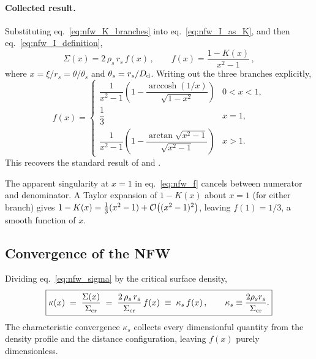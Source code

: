 \paragraph{Collected result.}
Substituting eq.~\eqref{eq:nfw_K_branches} into
eq.~\eqref{eq:nfw_I_as_K}, and then eq.~\eqref{eq:nfw_I_definition},
\begin{equation}
    \boxed{
    \Sigma(x) = 2\,\rho_s\,r_s\, f(x)\,,
    \qquad
    f(x) = \frac{1 - K(x)}{x^2 - 1}\,,}
    \label{eq:nfw_sigma}
\end{equation}
where $x = \xi / r_s = \theta / \theta_s$ and $\theta_s = r_s / D_{\mathrm{d}}$.
Writing out the three branches explicitly,
\begin{equation}
    f(x) = \begin{cases}
    \dfrac{1}{x^2 - 1}\!\left(1 - \dfrac{\operatorname{arccosh}(1/x)}{\sqrt{1-x^2}}\right)
            & 0 < x < 1, \\[8pt]
    \dfrac{1}{3} & x = 1, \\[8pt]
    \dfrac{1}{x^2 - 1}\!\left(1 - \dfrac{\arctan\!\sqrt{x^2-1}}{\sqrt{x^2-1}}\right)
            & x > 1.
    \end{cases}
    \label{eq:nfw_f}
\end{equation}
This recovers the standard result of \citet{bartelmann_1996} and
\citet{wright_brainerd_2000}.

\begin{remark}
The apparent singularity at $x = 1$ in eq.~\eqref{eq:nfw_f} cancels
between numerator and denominator.  A Taylor expansion of $1 - K(x)$
about $x = 1$ (for either branch) gives
$1 - K(x) = \tfrac{1}{3}(x^2 - 1) + \mathcal{O}\!\left((x^2-1)^2\right)$, leaving
$f(1) = 1/3$, a smooth function of $x$.
\end{remark}

\subsection{Convergence of the NFW}

Dividing eq.~\eqref{eq:nfw_sigma} by the critical surface density,
\begin{equation}
    \boxed{
    \kappa(x) \;=\; \frac{\Sigma(x)}{\Sigma_{\mathrm{cr}}}
    \;=\; \frac{2\,\rho_s\,r_s}{\Sigma_{\mathrm{cr}}}\, f(x)
    \;\equiv\; \kappa_s\, f(x) \,,
    \qquad
    \kappa_s \equiv \frac{2\rho_s r_s}{\Sigma_{\mathrm{cr}}}.}
    \label{eq:nfw_kappa}
\end{equation}
The characteristic convergence $\kappa_s$ collects every
dimensionful quantity from the density profile and the distance
configuration, leaving $f(x)$ purely dimensionless.

